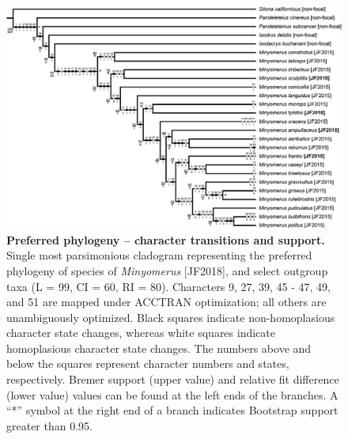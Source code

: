\documentclass[fleqn,10pt,lineno]{wlpeerj} %
\begin{document}
\begin{figure}[h]
	\centering
	\begin{sideways}
		\includegraphics[height=0.75\textwidth]{tree1.jpg}
	\end{sideways}
	\caption{\textbf{Preferred phylogeny -- character transitions and support.} Single most parsimonious cladogram representing the preferred phylogeny of species of \textit{Minyomerus} [JF2018], and select outgroup taxa (L = 99, CI = 60, RI = 80). Characters 9, 27, 39, 45 - 47, 49, and 51 are mapped under ACCTRAN optimization; all others are unambiguously optimized. Black squares indicate non-homoplasious character state changes, whereas white squares indicate homoplasious character state changes. The numbers above and below the squares represent character numbers and states, respectively. Bremer support (upper value) and relative fit difference (lower value) values can be found at the left ends of the branches. A ``*'' symbol at the right end of a branch indicates Bootstrap support greater than 0.95.}
	\label{fig:tree1}
\end{figure}
\end{document}
